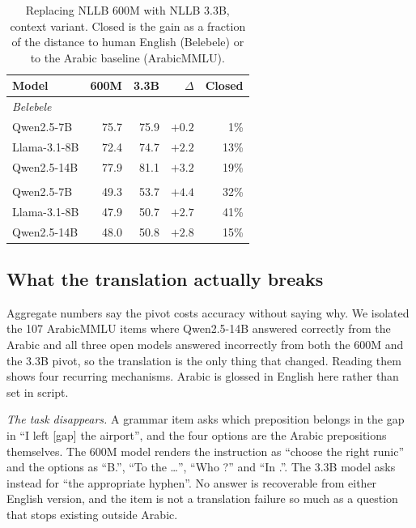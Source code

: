 \documentclass[conference,a4paper]{IEEEtran}
\begin{document}
\begin{table}[t]
\caption{Replacing NLLB 600M with NLLB 3.3B, context variant. Closed is the
gain as a fraction of the distance to human English (Belebele) or to the
Arabic baseline (ArabicMMLU).}
\label{tab:3b}
\centering
\footnotesize
\setlength{\tabcolsep}{4pt}
\begin{tabular}{lrrrr}
\toprule
Model & 600M & 3.3B & $\Delta$ & Closed \\
\midrule
\multicolumn{5}{l}{\textit{Belebele}} \\
Qwen2.5-7B   & 75.7 & 75.9 & $+0.2$ & 1\% \\
Llama-3.1-8B & 72.4 & 74.7 & $+2.2$ & 13\% \\
Qwen2.5-14B  & 77.9 & 81.1 & $+3.2$ & 19\% \\
\addlinespace
\multicolumn{5}{l}{\textit{ArabicMMLU}} \\
Qwen2.5-7B   & 49.3 & 53.7 & $+4.4$ & 32\% \\
Llama-3.1-8B & 47.9 & 50.7 & $+2.7$ & 41\% \\
Qwen2.5-14B  & 48.0 & 50.8 & $+2.8$ & 15\% \\
\bottomrule
\end{tabular}
\end{table}

\subsection{What the translation actually breaks}
\label{sec:qualitative}

Aggregate numbers say the pivot costs accuracy without saying why. We isolated
the 107 ArabicMMLU items where Qwen2.5-14B answered correctly from the Arabic
and all three open models answered incorrectly from both the 600M and the 3.3B
pivot, so the translation is the only thing that changed. Reading them shows
four recurring mechanisms. Arabic is glossed in English here rather than set in
script.

\textit{The task disappears.} A grammar item asks which preposition belongs in
the gap in ``I left [gap] the airport'', and the four options are the Arabic
prepositions themselves. The 600M model renders the instruction as ``choose the
right runic'' and the options as ``B.'', ``To the \dots'', ``Who ?'' and ``In
.''. The 3.3B model asks instead for ``the appropriate hyphen''. No answer is
recoverable from either English version, and the item is not a translation
failure so much as a question that stops existing outside Arabic.
\end{document}
